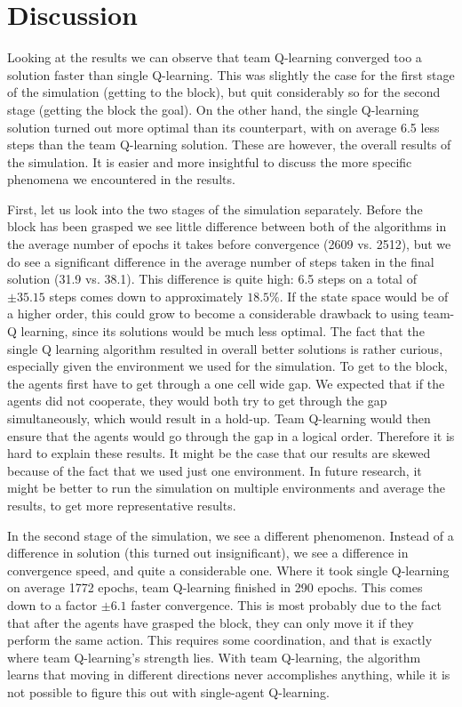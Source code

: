 \section{Discussion}
Looking at the results we can observe that team Q-learning converged too a solution faster than single Q-learning. This was slightly the case for the first stage of the simulation (getting to the block), but quit considerably so for the second stage (getting the block the goal). On the other hand, the single Q-learning solution turned out more optimal than its counterpart, with on average 6.5 less steps than the team Q-learning solution. These are however, the overall results of the simulation. It is easier and more insightful to discuss the more specific phenomena we encountered in the results.

First, let us look into the two stages of the simulation separately. Before the block has been grasped we see little difference between both of the algorithms in the average number of epochs it takes before convergence (2609 vs. 2512), but we do see a significant difference in the average number of steps taken in the final solution (31.9 vs. 38.1). This difference is quite high: 6.5 steps on a total of $\pm 35.15$ steps comes down to approximately $18.5\%$. If the state space would be of a higher order, this could grow to become a considerable drawback to using team-Q learning, since its solutions would be much less optimal. The fact that the single Q learning algorithm resulted in overall better solutions is rather curious, especially given the environment we used for the simulation. 
To get to the block, the agents first have to get through a one cell wide gap. We expected that if the agents did not cooperate, they would both try to get through the gap simultaneously, which would result in a hold-up. Team Q-learning would then ensure that the agents would go through the gap in a logical order. Therefore it is hard to explain these results.
It might be the case that our results are skewed because of the fact that we used just one environment. In future research, it might be better to run the simulation on multiple environments and average the results, to get more representative results.

In the second stage of the simulation, we see a different phenomenon. Instead of a difference in solution (this turned out insignificant), we see a difference in convergence speed, and quite a considerable one. Where it took single Q-learning on average 1772 epochs, team Q-learning finished in 290 epochs. This comes down to a factor $\pm 6.1$ faster convergence. This is most probably due to the fact that after the agents have grasped the block, they can only move it if they perform the same action. This requires some coordination, and that is exactly where team Q-learning's strength lies. With team Q-learning, the algorithm learns that moving in different directions never accomplishes anything, while it is not possible to figure this out with single-agent Q-learning.

